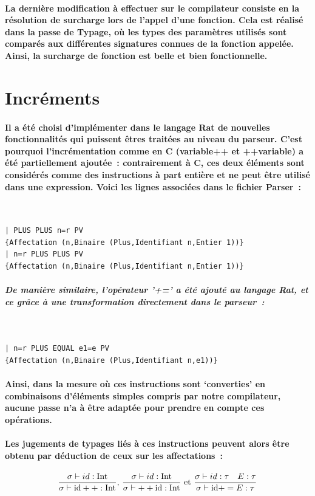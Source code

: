 \documentclass[french]{article}
\newcommand{\jugementIncrementPost}{
        \dfrac{\sigma \vdash id : \text{Int}}
              {\sigma \vdash \text{id}++ : \text{Int}}
        }
\newcommand{\jugementIncrementPre}{
        \dfrac{\sigma \vdash id : \text{Int}}
              {\sigma \vdash ++\text{id} : \text{Int}}
        }
\newcommand{\jugementPlusEq}{
        \dfrac{\sigma \vdash id : \tau \hspace*{10pt} E : \tau}
              {\sigma \vdash \text{id} += E : \tau}
        }
\begin{document}
\paragraph{La dernière modification à effectuer sur le compilateur consiste en la résolution de surcharge lors de l'appel d'une fonction. Cela est réalisé
dans la passe de Typage, où les types des paramètres utilisés sont comparés aux différentes signatures connues de la fonction appelée. Ainsi, la surcharge
de fonction est belle et bien fonctionnelle.}

\section{Incréments}
\paragraph*{Il a été choisi d'implémenter dans le langage Rat de nouvelles fonctionnalités qui puissent êtres traitées au niveau du parseur. C'est pourquoi
l'incrémentation comme en C (variable++ et ++variable) a été partiellement ajoutée~: contrairement à C, ces deux éléments sont considérés comme
des instructions à part entière et ne peut être utilisé dans une expression. Voici les lignes associées dans le fichier Parser~:}
\,
\begin{lstlisting}
| PLUS PLUS n=r PV 
{Affectation (n,Binaire (Plus,Identifiant n,Entier 1))}
| n=r PLUS PLUS PV 
{Affectation (n,Binaire (Plus,Identifiant n,Entier 1))}
\end{lstlisting}

\subparagraph*{De manière similaire, l'opérateur '+=' a été ajouté au langage Rat, et ce grâce à une transformation directement dans le parseur~:}
\,
\begin{lstlisting}
| n=r PLUS EQUAL e1=e PV 
{Affectation (n,Binaire (Plus,Identifiant n,e1))}
\end{lstlisting}

\paragraph*{Ainsi, dans la mesure où ces instructions sont `converties' en combinaisons d'éléments simples compris par notre compilateur, aucune passe n'a
à être adaptée pour prendre en compte ces opérations.}
\paragraph*{Les jugements de typages liés à ces instructions peuvent alors être obtenu par déduction de ceux sur les affectations~:}
\[\jugementIncrementPost \text{, } \jugementIncrementPre \text{ et } \jugementPlusEq\]
\end{document}

